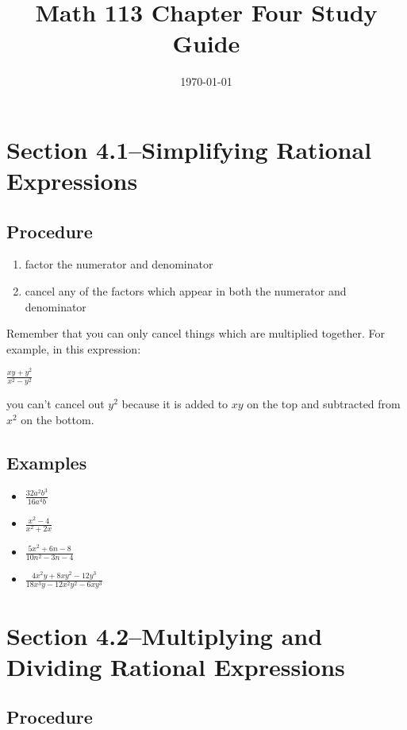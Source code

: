 \documentclass[fleqn,addpoints]{exam}
\title{Math 113 Chapter Four Study Guide}
\author{}
\date{\today}
\begin{document}
\maketitle

\section{Section 4.1--Simplifying Rational Expressions}

\subsection{Procedure}

\begin{enumerate}
  \item factor the numerator and denominator
  \item cancel any of the factors which appear in both the numerator and denominator
\end{enumerate}

Remember that you can only cancel things which are multiplied together.  For example, in this expression:

\( \displaystyle \frac{xy+y^2}{x^2-y^2} \)

you can't cancel out $y^2$ because it is added to $xy$ on the top and subtracted from $x^2$ on the bottom.

\subsection{Examples}

\begin{itemize}
  \item \( \displaystyle \frac{32a^2b^3}{16a^4b} \)
  \item \( \displaystyle \frac{x^2-4}{x^2+2x} \)
  \item \( \displaystyle\frac{5x^2+6n-8}{10n^2-3n-4} \)
  \item \( \displaystyle\frac{4x^2y+8xy^2-12y^3}{18x^3y-12x^2y^2-6xy^3} \)
\end{itemize}

\section{Section 4.2--Multiplying and Dividing Rational Expressions}

\subsection{Procedure}
\end{document}
